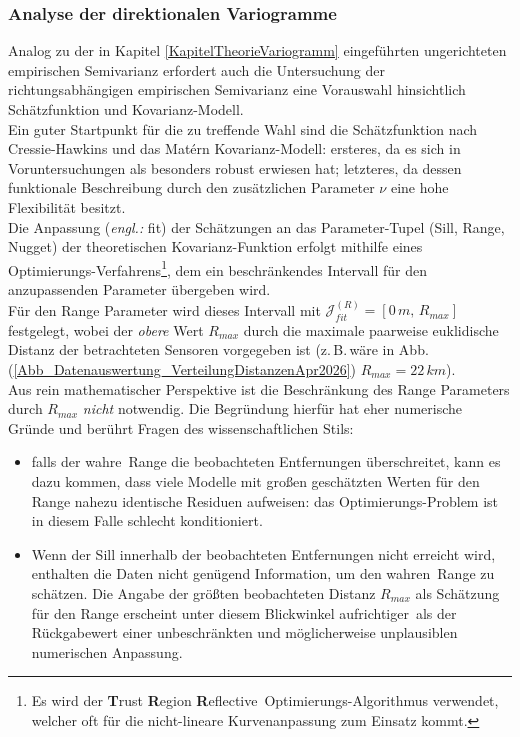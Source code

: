 \subsubsection{Analyse der direktionalen Variogramme}
\label{KapitelDatenauswertung_Ergebnisse_Variogramme}
Analog zu der in Kapitel \ref{KapitelTheorieVariogramm} 
eingeführten ungerichteten empirischen Semivarianz 
erfordert auch die Untersuchung der richtungsabhängigen 
empirischen  Semivarianz eine Vorauswahl hinsichtlich 
Schätzfunktion und Kovarianz-Modell.\\
Ein guter Startpunkt für die zu treffende Wahl 
sind die Schätzfunktion nach Cressie-Hawkins
und das Matérn Kovarianz-Modell: ersteres, da es sich in
Voruntersuchungen als  besonders robust erwiesen 
hat; letzteres, da dessen funktionale Beschreibung durch den
zusätzlichen Parameter $\nu$ eine hohe Flexibilität besitzt.\\
Die Anpassung (\textit{engl.:} \glqq fit\grqq ) der Schätzungen an das Parameter-Tupel 
(Sill, Range, Nugget) der theoretischen 
Kovarianz-Funktion erfolgt mithilfe eines 
Optimierungs-Verfahrens\footnote{Es wird der 
\glqq \textbf{T}rust \textbf{R}egion
\textbf{R}eflective\grqq\ Optimierungs-Algorithmus verwendet,
welcher oft für die nicht-lineare Kurvenanpassung zum Einsatz kommt.}, dem ein beschränkendes Intervall für 
den anzupassenden Parameter übergeben wird.\\
Für den Range Parameter wird dieses Intervall mit
$\mathcal{J}^{(R)}_{fit}=
[0\,m,\,R_{max}]$ festgelegt, wobei der \textit{obere} 
Wert $R_{max}$ durch die maximale paarweise
euklidische Distanz der
betrachteten Sensoren vorgegeben ist 
(z.\,B.\,wäre in 
Abb.\,(\ref{Abb_Datenauswertung_VerteilungDistanzenApr2026})
$R_{max}=22\,km$).\\

Aus rein mathematischer Perspektive ist die Beschränkung des
Range Parameters durch $R_{max}$ \textit{nicht} notwendig.
Die Begründung hierfür hat eher numerische Gründe und berührt Fragen 
des wissenschaftlichen Stils:
\begin{itemize}[topsep=2pt,parsep=1pt,itemsep=0.5pt]
\item[a) ] falls der \glqq wahre\grqq\ Range die beobachteten Entfernungen 
überschreitet, kann es dazu kommen, dass viele Modelle mit großen 
geschätzten Werten für den Range nahezu identische Residuen 
aufweisen: das Optimierungs-Problem ist in diesem Falle schlecht konditioniert.
\item[b) ] Wenn der Sill innerhalb der beobachteten Entfernungen nicht erreicht wird,
enthalten die Daten nicht genügend Information, um den \glqq wahren\grqq\ Range 
zu schätzen. Die Angabe der größten beobachteten Distanz $R_{max}$ als Schätzung für 
den Range erscheint unter diesem Blickwinkel \glqq aufrichtiger\grqq\ als
der Rückgabewert einer unbeschränkten und möglicherweise unplausiblen
 numerischen Anpassung.
\end{itemize}

